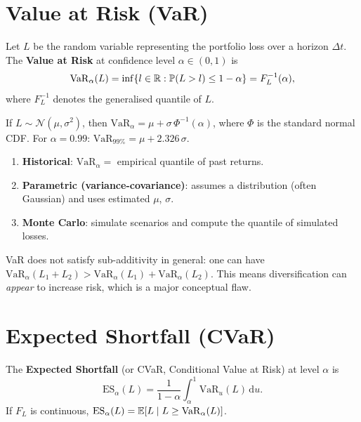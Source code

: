 \section{Value at Risk (VaR)}

\begin{definition}
Let $L$ be the random variable representing the portfolio loss over a horizon
$\Delta t$. The \textbf{Value at Risk} at confidence level
$\alpha \in (0, 1)$ is
\[
    \mathrm{VaR}_\alpha(L) = \inf\{l \in \mathbb{R} : \mathbb{P}(L > l) \leq 1 - \alpha\}
    = F_L^{-1}(\alpha),
\]
where $F_L^{-1}$ denotes the generalised quantile of $L$.
\end{definition}

\begin{example}
If $L \sim \mathcal{N}(\mu, \sigma^2)$, then
$\mathrm{VaR}_\alpha = \mu + \sigma\,\Phi^{-1}(\alpha)$,
where $\Phi$ is the standard normal CDF. For $\alpha = 0.99$:
$\mathrm{VaR}_{99\%} = \mu + 2.326\,\sigma$.
\end{example}

\begin{proposition}
\begin{enumerate}
    \item \textbf{Historical}: $\mathrm{VaR}_\alpha =$ empirical quantile of
    past returns.
    \item \textbf{Parametric (variance-covariance)}: assumes a distribution
    (often Gaussian) and uses estimated $\mu$, $\sigma$.
    \item \textbf{Monte Carlo}: simulate scenarios and compute the quantile
    of simulated losses.
\end{enumerate}
\end{proposition}

\begin{attention}[title=\textbf{Limitations of VaR}]
VaR does not satisfy sub-additivity in general: one can have
$\mathrm{VaR}_\alpha(L_1 + L_2) > \mathrm{VaR}_\alpha(L_1) + \mathrm{VaR}_\alpha(L_2)$.
This means diversification can \emph{appear} to increase risk, which is a
major conceptual flaw.
\end{attention}

\section{Expected Shortfall (CVaR)}

\begin{definition}
The \textbf{Expected Shortfall} (or CVaR, Conditional Value at Risk) at
level $\alpha$ is
\[
    \mathrm{ES}_\alpha(L) = \frac{1}{1-\alpha}\int_\alpha^1
    \mathrm{VaR}_u(L)\,\mathrm{d}u.
\]
If $F_L$ is continuous,
$\mathrm{ES}_\alpha(L) = \mathbb{E}[L \mid L \geq \mathrm{VaR}_\alpha(L)]$.
\end{definition}

